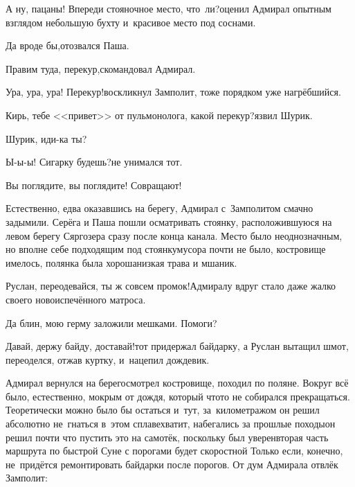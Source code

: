 \diagdash А ну, пацаны! Впереди стояночное место, что~ли?\mdash оценил Адмирал опытным взглядом небольшую бухту и~красивое место под соснами.

\diagdash Да вроде бы,\mdash отозвался Паша.

\diagdash Правим туда, перекур,\mdash скомандовал Адмирал. 

\diagdash Ура, ура, ура! Перекур!\mdash воскликнул Замполит, тоже порядком уже нагрёбшийся.

\diagdash Кирь, тебе <<привет>> от пульмонолога, какой перекур?\mdash язвил Шурик.


\diagdash Шурик, иди-ка ты?

\diagdash Ы-ы-ы! Сигарку будешь?\mdash не унимался тот.

\diagdash Вы поглядите, вы поглядите! Совращают!

Естественно, едва оказавшись на берегу, Адмирал с~Замполитом смачно задымили. Серёга и Паша пошли осматривать стоянку, расположившуюся на левом берегу Сяргозера сразу после конца канала. Место было неоднозначным, но вполне себе подходящим под стоянку\mdash мусора почти не было, костровище имелось, полянка была хороша\mdash низкая трава и мшаник.

\diagdash Руслан, переодевайся, ты ж совсем промок!\mdash Адмиралу вдруг стало даже жалко своего новоиспечённого матроса. 

\diagdash Да блин, мою герму заложили мешками. Помоги?

\diagdash Давай, держу байду, доставай!\mdash тот придержал байдарку, а Руслан вытащил шмот, переоделся, отжав куртку, и~нацепил дождевик. 

Адмирал вернулся на берег\mdash осмотрел костровище, походил по поляне. Вокруг всё было, естественно, мокрым от дождя, который что\sdash то не собирался прекращаться. Теоретически можно было бы остаться и~тут, за~километражом он решил абсолютно не~гнаться в~этом сплаве\mdash хватит, набегались за прошлые походы\mdash он решил почти что пустить это на самотёк, поскольку был уверен\mdash вторая часть маршрута по быстрой Суне с порогами будет скоростной\myldots{} Только если, конечно, не~придётся ремонтировать байдарки после порогов. От дум Адмирала отвлёк Замполит:

